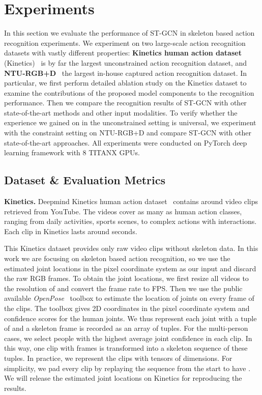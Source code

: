 \documentclass[letterpaper]{article} \usepackage{aaai18}  \usepackage{times}  \usepackage{helvet}  \usepackage{courier}  \usepackage{url}  \usepackage{graphicx}
\begin{document}
\section{Experiments}

In this section we evaluate the performance of ST-GCN in skeleton based action recognition experiments.
We experiment on two large-scale action recognition datasets with vastly different properties: \textbf{Kinetics human action dataset} (Kinetics)~\cite{Kay2017Kinetics} is by far the largest unconstrained action recognition dataset, and \textbf{NTU-RGB+D}~\cite{Shahroudy2016CVPR} the largest in-house captured action recognition dataset.
In particular, we first perform detailed ablation study on the Kinetics dataset to examine the contributions of the proposed model components to the recognition performance.
Then we compare the recognition results of ST-GCN with other state-of-the-art methods and other input modalities.
To verify whether the experience we gained on in the unconstrained setting is universal, we experiment with the constraint setting on NTU-RGB+D and compare ST-GCN with other state-of-the-art approaches.
All experiments were conducted on PyTorch deep learning framework with 8 TITANX GPUs.



\subsection{Dataset \& Evaluation Metrics}
\textbf{Kinetics.}
Deepmind Kinetics human action dataset~\cite{Kay2017Kinetics} contains around  video clips retrieved from YouTube.
The videos cover as many as  human action classes, ranging from daily activities, sports scenes, to complex actions with interactions.
Each clip in Kinetics lasts around  seconds.

This Kinetics dataset provides only raw video clips without skeleton data. 
In this work we are focusing on skeleton based action recognition, so we use the estimated joint locations in the pixel coordinate system as our input and discard the raw RGB frames.
To obtain the joint locations, we first resize all videos to the resolution of  and convert the frame rate to  FPS. Then we use the public available \emph{OpenPose}~\cite{Cao2017Openpose} toolbox to estimate the location of  joints on every frame of the clips.
The toolbox gives 2D coordinates  in the pixel coordinate system and confidence scores  for the  human joints.
We thus represent each joint with a tuple of  and a skeleton frame is recorded as an array of  tuples.
For the multi-person cases, we select  people with the highest average joint confidence in each clip.
In this way, one clip with  frames is transformed into a skeleton sequence of these tuples.
In practice, we represent the clips with tensors of  dimensions.
For simplicity, we pad every clip by replaying the sequence from the start to have .
We will release the estimated joint locations on Kinetics for reproducing the results.
\end{document}
